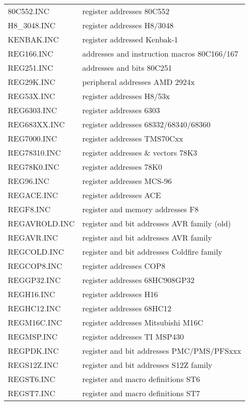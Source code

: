 \documentclass[12pt,twoside]{report}
\begin{document}
\begin{center}
\begin{longtable}{|l|l|}
80C552.INC        & register addresses 80C552 \\
H8\_3048.INC      & register addresses H8/3048 \\
KENBAK.INC        & register addressed Kenbak-1 \\
REG166.INC        & addresses and instruction macros 80C166/167 \\
REG251.INC        & addresses and bits 80C251 \\
REG29K.INC        & peripheral addresses AMD 2924x \\
REG53X.INC        & register addresses H8/53x \\
REG6303.INC       & register addresses 6303 \\
REG683XX.INC      & register addresses 68332/68340/68360 \\
REG7000.INC       & register addresses TMS70Cxx \\
REG78310.INC      & register addresses \& vectors 78K3 \\
REG78K0.INC       & register addresses 78K0 \\
REG96.INC         & register addresses MCS-96 \\
REGACE.INC        & register addresses ACE \\
REGF8.INC         & register and memory addresses F8 \\
REGAVROLD.INC     & register and bit addresses AVR family (old)\\
REGAVR.INC        & register and bit addresses AVR family \\
REGCOLD.INC       & register and bit addresses Coldfire family \\
REGCOP8.INC       & register addresses COP8 \\
REGGP32.INC       & register addresses 68HC908GP32 \\
REGH16.INC        & register addresses H16\\
REGHC12.INC       & register addresses 68HC12 \\
REGM16C.INC       & register addresses Mitsubishi M16C \\
REGMSP.INC        & register addresses TI MSP430 \\
REGPDK.INC        & register and bit addresses PMC/PMS/PFSxxx \\
REGS12Z.INC       & register and bit addresses S12Z family \\
REGST6.INC        & register and macro definitions ST6 \\
REGST7.INC        & register and macro definitions ST7 \\

\end{longtable}
\end{center}
\end{document}
